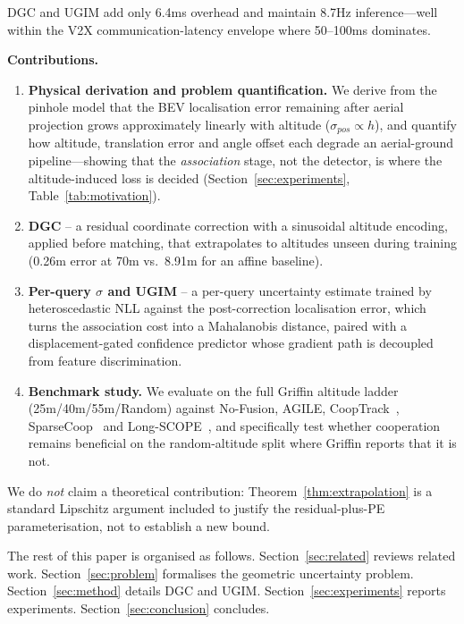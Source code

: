 \documentclass[9.5pt,twocolumn,a4paper]{IEEEtran}
\begin{document}
DGC and UGIM add only 6.4ms overhead and maintain 8.7Hz inference---well within the V2X communication-latency envelope where 50--100ms dominates.

\noindent\textbf{Contributions.}
\begin{enumerate}
    \item \textbf{Physical derivation and problem quantification.} We derive from the pinhole model that the BEV localisation error remaining after aerial projection grows approximately linearly with altitude ($\sigma_{pos} \propto h$), and quantify how altitude, translation error and angle offset each degrade an aerial-ground pipeline---showing that the \emph{association} stage, not the detector, is where the altitude-induced loss is decided (Section~\ref{sec:experiments}, Table~\ref{tab:motivation}).
    \item \textbf{DGC} -- a residual coordinate correction with a sinusoidal altitude encoding, applied before matching, that extrapolates to altitudes unseen during training (0.26m error at 70m vs.\ 8.91m for an affine baseline).
    \item \textbf{Per-query $\sigma$ and UGIM} -- a per-query uncertainty estimate trained by heteroscedastic NLL against the post-correction localisation error, which turns the association cost into a Mahalanobis distance, paired with a displacement-gated confidence predictor whose gradient path is decoupled from feature discrimination.
    \item \textbf{Benchmark study.} We evaluate on the full Griffin altitude ladder (25m/40m/55m/Random) against No-Fusion, AGILE, CoopTrack~\cite{cooptrack}, SparseCoop~\cite{sparsecoop} and Long-SCOPE~\cite{longscope}, and specifically test whether cooperation remains beneficial on the random-altitude split where Griffin reports that it is not.
\end{enumerate}
We do \emph{not} claim a theoretical contribution: Theorem~\ref{thm:extrapolation} is a standard Lipschitz argument included to justify the residual-plus-PE parameterisation, not to establish a new bound.

The rest of this paper is organised as follows. Section~\ref{sec:related} reviews related work. Section~\ref{sec:problem} formalises the geometric uncertainty problem. Section~\ref{sec:method} details DGC and UGIM. Section~\ref{sec:experiments} reports experiments. Section~\ref{sec:conclusion} concludes.

\end{document}
